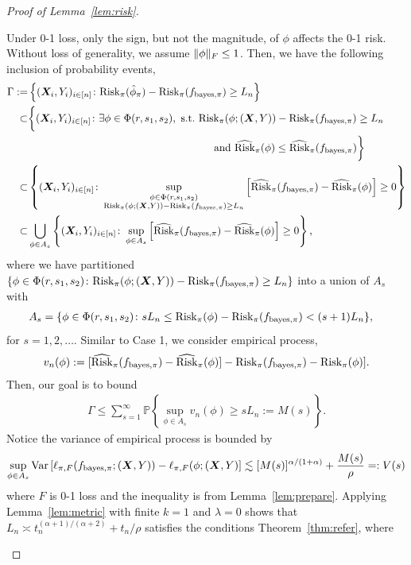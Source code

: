\documentclass[11pt]{article}
\theoremstyle{plain}
\theoremstyle{definition}
\def\bayespif{f_{\textup{bayes},\pi}}
\def\risk{\textup{Risk}_\pi}
\def\erisk{\widehat{\textup{Risk}}_\pi}
\begin{document}
\begin{proof}[Proof of Lemma~\ref{lem:risk}]
\begin{enumerate}[label={2.\arabic*},wide, labelwidth=!, labelindent=0pt]
Under 0-1 loss, only the sign, but not the magnitude, of $\phi$ affects the 0-1 risk. Without loss of generality, we assume  $\lVert\phi\rVert_F \leq 1$. Then, we have the following inclusion of probability events,
\begin{align}
\Gamma :=&\left\{(\mX_i,Y_i)_{i\in[n]}\colon \risk(\hat\phi_{\pi})-\risk(\bayespif)\geq L_n \right\}\notag \\
 \subset &
 \bigg\{(\mX_i,Y_i)_{i\in[n]}\colon \exists \phi\in\Phi(r,s_1,s_2),\ \text{s.t.}\  \risk(\phi; (\mX,Y))-\risk(\bayespif)\geq L_n \notag \\&\hspace*{6.2cm} \text{and}\  \erisk(\phi)\leq \erisk(\bayespif)\bigg\}\notag \\
 \subset &
\left\{(\mX_i,Y_i)_{i\in[n]} \colon \sup_{\substack{\phi\in\Phi(r,s_1,s_2)\\  
\risk(\phi; (\mX,Y))-\risk(\bayespif)\geq L_n  }}\left[\erisk(\bayespif)-\erisk(\phi)\right]\geq0\right\} \notag \\
\subset & \bigcup_{\phi\in A_{s}}\left\{(\mX_i,Y_i)_{i\in[n]}\colon \sup_{\phi\in A_{s}} \left[\erisk(\bayespif)-\erisk(\phi)\right]\geq 0 \right \},
\end{align}
where we have partitioned $\{\phi\in\Phi(r,s_1,s_2)\colon \risk(\phi; (\mX,Y))-\risk(\bayespif)\geq L_n\}$ into a union of $A_s$ with
\begin{align}
A_{s}&=\{\phi\in \Phi(r,s_1,s_2)\colon sL_n\leq \risk(\phi)-\risk(\bayespif)< (s+1) L_n\},
\end{align}
for $s=1,2,\ldots$. 
Similar to Case 1, we consider empirical process, 
\begin{align*}
v_n(\phi):= [\erisk(\bayespif)-\erisk(\phi)]-\risk(\bayespif)-\risk(\phi)].
\end{align*}
Then,  our goal is to bound
\begin{align}\label{eq:01bd}
\Gamma\leq \sum_{s=1}^\infty \mathbb{P}\left\{\sup_{\phi\in A_s} v_n(\phi)\geq sL_n:=M(s)\right\}.
\end{align}
Notice the variance of empirical process is bounded by
\begin{align}
\sup_{\phi\in A_{s}}\textup{Var}\left[\ell_{\pi,F}(\bayespif;(\mX,Y))-\ell_{\pi,F}(\phi;(\mX,Y)\right] \lesssim [M(s)]^{\alpha/(1+\alpha)}+{M(s)\over \rho}=:V(s)
\end{align}
where $F$ is 0-1 loss and the inequality is from Lemma~\ref{lem:prepare}.
Applying Lemma~\ref{lem:metric} with  finite $k = 1$ and $\lambda = 0$  shows that $L_n\asymp t_n^{(\alpha+1)/(\alpha+2)}+ t_n/\rho$ satisfies the conditions Theorem~\ref{thm:refer}, where 

\end{enumerate}
\end{proof}
\end{document}
